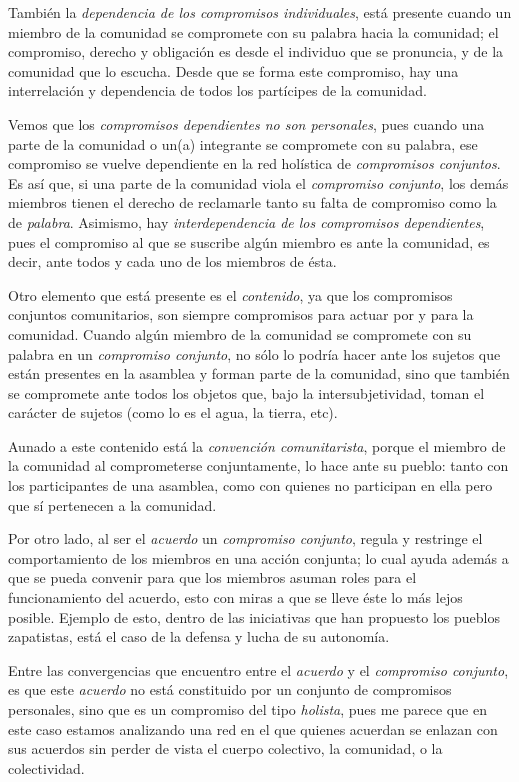 \documentclass[oneside]{book}
\begin{document}
También la \textit{dependencia de los compromisos individuales}, está presente cuando un miembro de la comunidad se compromete con su palabra hacia la comunidad; el compromiso, derecho y obligación es desde el individuo que se pronuncia, y de la comunidad que lo escucha. Desde que se forma este compromiso, hay una interrelación y dependencia de todos los partícipes de la comunidad.
	
Vemos que los \textit{compromisos dependientes no son personales}, pues cuando una parte de la comunidad o un(a) integrante se compromete con su palabra, ese compromiso se vuelve dependiente en la red holística de \textit{compromisos conjuntos}. Es así que, si una parte de la comunidad viola el \textit{compromiso conjunto}, los demás miembros tienen el derecho de reclamarle tanto su falta de compromiso como la de \textit{palabra}. Asimismo, hay \textit{interdependencia de los compromisos dependientes}, pues el compromiso al que se suscribe algún miembro es ante la comunidad, es decir, ante todos y cada uno de los miembros de ésta.
	
Otro elemento que está presente es el \textit{contenido}, ya que los compromisos conjuntos comunitarios, son siempre compromisos para actuar por y para la comunidad. Cuando algún miembro de la comunidad se compromete con su palabra en un \textit{compromiso conjunto}, no sólo lo podría hacer ante los sujetos que están presentes en la asamblea y forman parte de la comunidad, sino que también se compromete ante todos los objetos que, bajo la intersubjetividad, toman el carácter de sujetos (como lo es el agua, la tierra, etc).
	
Aunado a este contenido está la \textit{convención comunitarista}, porque el miembro de la comunidad al comprometerse conjuntamente, lo hace ante su pueblo: tanto con los participantes de una asamblea, como con quienes no participan en ella pero que sí pertenecen a la comunidad.
	
Por otro lado, al ser el \textit{acuerdo} un \textit{compromiso conjunto}, regula y restringe el comportamiento de los miembros en una acción conjunta; lo cual ayuda además a que se pueda convenir para que los miembros asuman roles para el funcionamiento del acuerdo, esto con miras a que se lleve éste lo más lejos posible. Ejemplo de esto, dentro de las  iniciativas que han propuesto los pueblos zapatistas, está el caso de la defensa y lucha de su autonomía.
	
Entre las convergencias que encuentro entre el \textit{acuerdo} y el \textit{compromiso conjunto}, es que este \textit{acuerdo} no está constituido por un conjunto de compromisos personales, sino que es un compromiso del tipo \textit{holista}, pues me parece que en este caso estamos analizando una red en el que quienes acuerdan se enlazan con sus acuerdos sin perder de vista el cuerpo colectivo, la comunidad, o la colectividad. 
	
\end{document}
